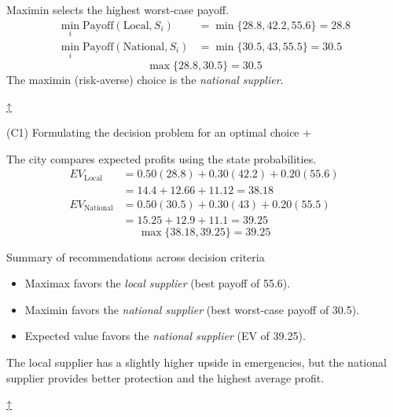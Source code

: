 \documentclass[11pt]{article}
\begin{document}
	
	Maximin selects the highest worst-case payoff.
	\[
	\begin{aligned}
		\min_i \text{Payoff}(\text{Local}, S_i) &= \min\{28.8, 42.2, 55.6\} = 28.8 \\
		\min_i \text{Payoff}(\text{National}, S_i) &= \min\{30.5, 43, 55.5\} = 30.5
	\end{aligned}
	\]
	\[
	\max\{28.8, 30.5\} = 30.5
	\]
	The maximin (risk-averse) choice is the \emph{national supplier}.
	
	
	\hyperref[problem7-criteria]{↑}
	
	
	
	
	(C1) Formulating the decision problem for an optimal choice
	+
	
	
	The city compares expected profits using the state probabilities.
	\[
	\begin{aligned}
		EV_{\text{Local}} &= 0.50(28.8) + 0.30(42.2) + 0.20(55.6) \\
		&= 14.4 + 12.66 + 11.12 = 38.18 \\
		EV_{\text{National}} &= 0.50(30.5) + 0.30(43) + 0.20(55.5) \\
		&= 15.25 + 12.9 + 11.1 = 39.25
	\end{aligned}
	\]
	\[
	\max\{38.18, 39.25\} = 39.25
	\]
	
	Summary of recommendations across decision criteria
	\begin{itemize}
		\item Maximax favors the \emph{local supplier} (best payoff of 55.6).
		\item Maximin favors the \emph{national supplier} (best worst-case payoff of 30.5).
		\item Expected value favors the \emph{national supplier} (EV of 39.25).
	\end{itemize}
	
	
	
	The local supplier has a slightly higher upside in emergencies, but the national supplier provides better protection and the highest average profit.
	
	
	
	\hyperref[problem7-criteria]{↑}
\end{document}
